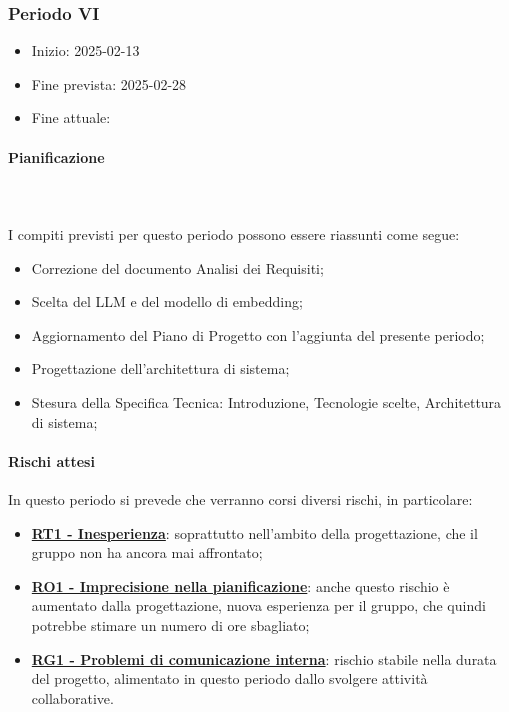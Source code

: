 \subsubsection{Periodo VI}

\begin{itemize}
    \item Inizio: 2025-02-13
    \item Fine prevista: 2025-02-28
    \item Fine attuale: 
\end{itemize}
\paragraph{Pianificazione} \hspace{1cm}
\\ \hspace{1cm} \\

I compiti previsti per questo periodo possono essere riassunti come segue:  
\begin{itemize}
    \item Correzione del documento Analisi dei Requisiti;
    \item Scelta del LLM e del modello di embedding;
    \item Aggiornamento del Piano di Progetto con l'aggiunta del presente periodo;
    \item Progettazione dell'architettura di sistema;
    \item Stesura della Specifica Tecnica: Introduzione, Tecnologie scelte, Architettura di sistema;
 
\end{itemize}

\paragraph{Rischi attesi}  
In questo periodo si prevede che verranno corsi diversi rischi, in particolare:
\begin{itemize}
    \item \textbf{\hyperlink{RT1}{RT1 - Inesperienza}}: soprattutto nell'ambito della progettazione, che il gruppo non ha ancora mai affrontato;
    \item \textbf{\hyperlink{RO1}{RO1 - Imprecisione nella pianificazione}}: anche questo rischio è aumentato dalla progettazione, nuova esperienza per il gruppo, che quindi potrebbe stimare un numero di ore sbagliato;
    \item \textbf{\hyperlink{RG1}{RG1 - Problemi di comunicazione interna}}: rischio stabile nella durata del progetto, alimentato in questo periodo dallo svolgere attività collaborative.
   
\end{itemize}

